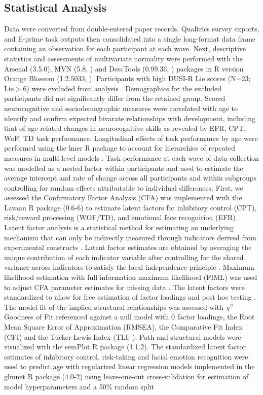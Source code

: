 \documentclass{article}%
\begin{document}
\subsection*{Statistical Analysis} Data were converted from double-entered paper records, Qualtrics survey exports, and E-prime task outputs then consolidated into a single long-format data frame containing an observation for each participant at each wave. Next, descriptive statistics and assessments of multivariate normality were performed with the Arsenal (3.5.0), MVN (5.8, \cite{MVN}) and DescTools (0.99.36, \cite{DescTools}) packages in R version Orange Blossom (1.2.5033, \cite{R}). Participants with high DUSI-R Lie scores (N=23; Lie$>6$) were excluded from analysis \citep{dalla2003effects}. Demographics for the excluded participants did not significantly differ from the retained group. Scored neurocognitive and sociodemographic measures were correlated with age to identify and confirm expected bivarate relationships with development, including that of age-related changes in neurocognitive skills as revealed by EFR, CPT, WoF, TD task performance. Longitudinal effects of task performance by age were performed using the lmer R package to account for hierarchies of repeated measures in multi-level models \citep{lmer}. Task performance at each wave of data collection was modelled as a nested factor within participants and used to estimate the average intercept and rate of change across all participants and within subgroups controlling for random effects attributable to individual differences. First, we assessed the Confirmatory Factor Analysis (CFA) was implemented with the Lavaan R package (0.6-6) to estimate latent factors for inhibitory control (CPT), risk/reward processing (WOF/TD), and emotional face recognition (EFR) \citep{Lavaan}. Latent factor analysis is a statistical method for estimating an underlying mechanism that can only be indirectly measured through indicators derived from experimental constructs \citep{finch2015latent}. Latent factor estimates are obtained by averaging the unique contribution of each indicator variable after controlling for the shared variance across indicators to satisfy the local independence principle \citep{sobel1997measurement}. Maximum likelihood estimation with full information maximum likelihood (FIML) was used to adjust CFA parameter estimates for missing data \citep{cham2017full}. The latent factors were standardized to allow for free estimation of factor loadings and post hoc testing \citep{HuTzeBentler1998}. The model fit of the implied structural relationships was assessed with $\chi^2$ Goodness of Fit referenced against a null model with $0$ factor loadings, the Root Mean Square Error of Approximation (RMSEA), the Comparative Fit Index (CFI) and the Tucker-Lewis Index (TLI; \cite{KennyEtAl2015,HuTzeBentler1999, wu2009evaluating}). Path and structural models were visualized with the semPlot R package (1.1.2). The standardized latent factor estimates of inhibitory control, risk-taking and facial emotion recognition were used to predict age with regularized linear regression models implemented in the glmnet R package (4.0-2) using leave-one-out cross-validation for estimation of model hyperparameters and a 50\% random split 
\end{document}
